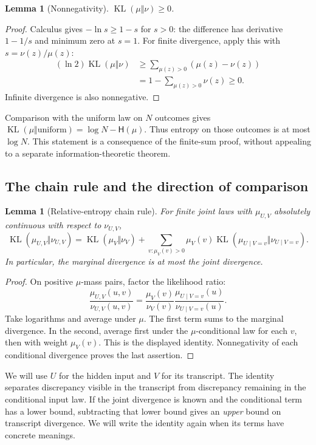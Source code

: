 \documentclass[11pt]{article}
\newtheorem{lemma}[theorem]{Lemma}
\theoremstyle{definition}
\theoremstyle{remark}
\newcommand{\Ent}{\mathsf H}
\newcommand{\KL}{\operatorname{KL}}
\numberwithin{equation}{section}
\begin{document}
\begin{lemma}[Nonnegativity]\label{lem:nonnegative}
\(\KL(\mu\Vert\nu)\ge0\).
\end{lemma}
\begin{proof}
Calculus gives \(-\ln s\ge1-s\) for \(s>0\): the difference has
derivative \(1-1/s\) and minimum zero at \(s=1\).
For finite divergence, apply this with \(s=\nu(z)/\mu(z)\):
\begin{align*}
 (\ln2)\KL(\mu\Vert\nu)
 &\ge\sum_{\mu(z)>0}(\mu(z)-\nu(z))\\
 &=1-\sum_{\mu(z)>0}\nu(z)\ge0.
\end{align*}
Infinite divergence is also nonnegative.
\end{proof}

Comparison with the uniform law on \(N\) outcomes gives
\(\KL(\mu\Vert\text{uniform})=\log N-\Ent(\mu)\).
Thus entropy on those outcomes is at most \(\log N\).
This statement is a consequence of the finite-sum proof, without
appealing to a separate information-theoretic theorem.

\subsection{The chain rule and the direction of comparison}

\begin{lemma}[Relative-entropy chain rule]\label{lem:KLchain}
For finite joint laws with \(\mu_{U,V}\) absolutely continuous with
respect to \(\nu_{U,V}\),
\begin{equation}\label{eq:KLchain}
 \KL(\mu_{U,V}\Vert\nu_{U,V})
 =\KL(\mu_V\Vert\nu_V)
 +\sum_{v:\mu_V(v)>0}\mu_V(v)
       \KL(\mu_{U\mid V=v}\Vert\nu_{U\mid V=v}).
\end{equation}
In particular, the marginal divergence is at most the joint divergence.
\end{lemma}
\begin{proof}
On positive \(\mu\)-mass pairs, factor the likelihood ratio:
\[
 \frac{\mu_{U,V}(u,v)}{\nu_{U,V}(u,v)}
 =\frac{\mu_V(v)}{\nu_V(v)}
  \frac{\mu_{U\mid V=v}(u)}{\nu_{U\mid V=v}(u)}.
\]
Take logarithms and average under \(\mu\). The first term sums to
the marginal divergence. In the second, average first under the
\(\mu\)-conditional law for each \(v\), then with weight \(\mu_V(v)\).
This is the displayed identity. Nonnegativity of each conditional
divergence proves the last assertion.
\end{proof}

We will use \(U\) for the hidden input and \(V\) for its transcript.
The identity separates discrepancy visible in the transcript from
discrepancy remaining in the conditional input law. If the joint
divergence is known and the conditional term has a lower bound,
subtracting that lower bound gives an \emph{upper} bound on transcript
divergence. We will write the identity again when its terms have
concrete meanings.
\end{document}
